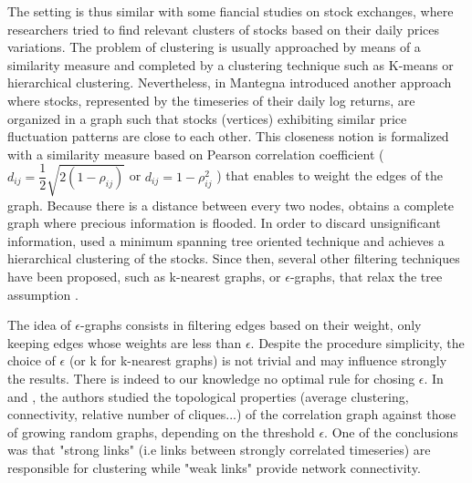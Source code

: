 \documentclass[conference]{IEEEtran}
\begin{document}
The setting is thus similar with some fiancial studies on stock exchanges, where researchers tried to find relevant clusters of stocks based on their daily prices variations. The problem of clustering is usually approached by means of a similarity measure and completed by a clustering technique such as K-means or hierarchical clustering. Nevertheless, in \cite{Mantegna1999} Mantegna introduced another approach where stocks, represented by the timeseries of their daily log returns, are organized in a graph such that stocks (vertices) exhibiting similar price fluctuation patterns are close to each other. This closeness notion is formalized with a similarity measure based on Pearson correlation coefficient ($ d_{ij} = \dfrac{1}{2}\sqrt{2(1-\rho_{ij})} $ or $ d_{ij} = 1 - \rho_{ij}^{2} $ ) that enables to weight the edges of the graph. Because there is a distance between every two nodes, \cite{Mantegna1999} obtains a complete graph where precious information is flooded. In order to discard unsignificant information, \cite{Mantegna1999} used a minimum spanning tree oriented technique and achieves a hierarchical clustering of the stocks. Since then, several other filtering techniques have been proposed, such as k-nearest graphs, or $ \epsilon $-graphs, that relax the tree assumption \cite{Onnela2004}.

The idea of $\epsilon$-graphs consists in filtering edges based on their weight, only keeping edges whose weights are less than $ \epsilon $. Despite the procedure simplicity, the choice of $ \epsilon $ (or k for k-nearest graphs) is not trivial and may influence strongly the results. There is indeed to our knowledge no optimal rule for chosing $ \epsilon $. In \cite{Garas2008} and \cite{Onnela2004}, the authors studied the topological properties (average clustering, connectivity, relative number of cliques...) of the correlation graph against those of growing random graphs, depending on the threshold $ \epsilon $. One of the conclusions was that "strong links" (i.e links between strongly correlated timeseries) are responsible for clustering while "weak links" provide network connectivity.
\end{document}
